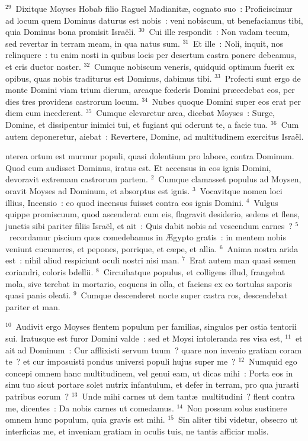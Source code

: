 ${}^{29}$~Dixitque Moyses Hobab filio Raguel Madianit\ae , cognato suo~: Proficiscimur ad locum quem Dominus daturus est nobis~: veni nobiscum, ut benefaciamus tibi, quia Dominus bona promisit Isra\"eli.
${}^{30}$~Cui ille respondit~: Non vadam tecum, sed revertar in terram meam, in qua natus sum.
${}^{31}$~Et ille~: Noli, inquit, nos relinquere~: tu enim nosti in quibus locis per desertum castra ponere debeamus, et eris ductor noster.
${}^{32}$~Cumque nobiscum veneris, quidquid optimum fuerit ex opibus, quas nobis traditurus est Dominus, dabimus tibi.
${}^{33}$~Profecti sunt ergo de monte Domini viam trium dierum, arcaque fœderis Domini pr\ae cedebat eos, per dies tres providens castrorum locum.
${}^{34}$~Nubes quoque Domini super eos erat per diem cum incederent.
${}^{35}$~Cumque elevaretur arca, dicebat Moyses~: Surge, Domine, et dissipentur inimici tui, et fugiant qui oderunt te, a facie tua.
${}^{36}$~Cum autem deponeretur, aiebat~: Revertere, Domine, ad multitudinem exercitus Isra\"el.

\bchapter
{}nterea ortum est murmur populi, quasi dolentium pro labore, contra Dominum. Quod cum audisset Dominus, iratus est. Et accensus in eos ignis Domini, devoravit extremam castrorum partem.
${}^{2}$~Cumque clamasset populus ad Moysen, oravit Moyses ad Dominum, et absorptus est ignis.
${}^{3}$~Vocavitque nomen loci illius, Incensio~: eo quod incensus fuisset contra eos ignis Domini.
${}^{4}$~Vulgus quippe promiscuum, quod ascenderat cum eis, flagravit desiderio, sedens et flens, junctis sibi pariter filiis Isra\"el, et ait~: Quis dabit nobis ad vescendum carnes~?
${}^{5}$~recordamur piscium quos comedebamus in \AE gypto gratis~: in mentem nobis veniunt cucumeres, et pepones, porrique, et c\ae pe, et allia.
${}^{6}$~Anima nostra arida est~: nihil aliud respiciunt oculi nostri nisi man.
${}^{7}$~Erat autem man quasi semen coriandri, coloris bdellii.
${}^{8}$~Circuibatque populus, et colligens illud, frangebat mola, sive terebat in mortario, coquens in olla, et faciens ex eo tortulas saporis quasi panis oleati.
${}^{9}$~Cumque descenderet nocte super castra ros, descendebat pariter et man.


${}^{10}$~Audivit ergo Moyses flentem populum per familias, singulos per ostia tentorii sui. Iratusque est furor Domini valde~: sed et Moysi intoleranda res visa est,
${}^{11}$~et ait ad Dominum~: Cur afflixisti servum tuum~? quare non invenio gratiam coram te~? et cur imposuisti pondus universi populi hujus super me~?
${}^{12}$~Numquid ego concepi omnem hanc multitudinem, vel genui eam, ut dicas mihi~: Porta eos in sinu tuo sicut portare solet nutrix infantulum, et defer in terram, pro qua jurasti patribus eorum~?
${}^{13}$~Unde mihi carnes ut dem tant\ae\ multitudini~? flent contra me, dicentes~: Da nobis carnes ut comedamus.
${}^{14}$~Non possum solus sustinere omnem hunc populum, quia gravis est mihi.
${}^{15}$~Sin aliter tibi videtur, obsecro ut interficias me, et inveniam gratiam in oculis tuis, ne tantis afficiar malis.


